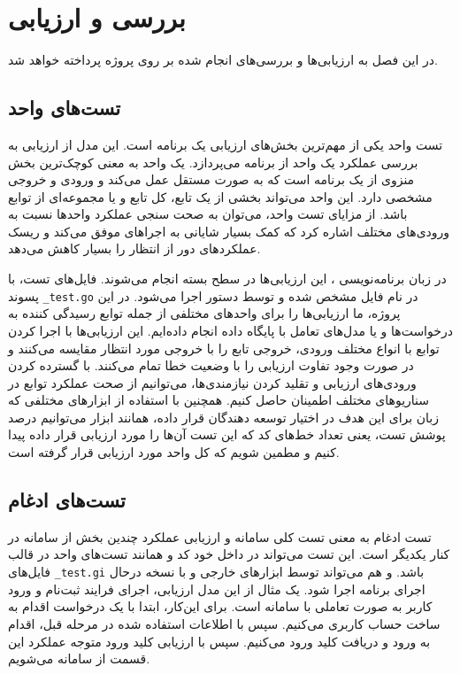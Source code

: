 \chapter{بررسی و ارزیابی}
در این فصل به ارزیابی‌ها و بررسی‌های انجام شده بر روی پروژه پرداخته خواهد شد.

\section{تست‌های واحد}
تست واحد یکی از مهم‌ترین بخش‌های ارزیابی یک برنامه است. این مدل از ارزیابی به بررسی عملکرد یک واحد از برنامه می‌پردازد. یک واحد به معنی کوچک‌ترین بخش منزوی از یک برنامه ‌است که به صورت مستقل عمل می‌کند و ورودی و خروجی مشخصی دارد. این واحد می‌تواند بخشی از یک تابع، کل تابع و یا مجموعه‌ای از توابع باشد. از مزایای تست واحد، می‌توان به صحت سنجی عملکرد واحد‌ها نسبت به ورودی‌های مختلف اشاره کرد که کمک بسیار شایانی به اجرا‌های موفق می‌کند و ریسک عملکردهای دور از انتظار را بسیار کاهش می‌دهد. 

در زبان برنامه‌نویسی ، این ارزیابی‌ها در سطح بسته انجام می‌شوند. فایل‌های تست، با پسوند \texttt{\_test.go} در نام فایل مشخص شده و توسط دستور  اجرا می‌شود. در این پروژه، ما ارزیابی‌ها را برای واحدهای مختلفی از جمله توابع رسیدگی کننده به درخواست‌ها و یا مدل‌های تعامل با پایگاه داده انجام داده‌ایم. این ارزیابی‌ها با اجرا کردن توابع با انواع مختلف ورودی، خروجی تابع را با خروجی مورد انتظار مقایسه می‌کنند و در صورت وجود تفاوت ارزیابی را با وضعیت خطا تمام می‌کنند. با گسترده کردن ورودی‌های ارزیابی و تقلید کردن نیازمندی‌ها، می‌توانیم از صحت عملکرد توابع در سناریو‌های مختلف اطمینان حاصل کنیم. همچنین با استفاده از ابزار‌های مختلفی که زبان  برای این هدف در اختیار توسعه دهندگان قرار داده، همانند ابزار  می‌توانیم درصد پوشش تست، یعنی تعداد خط‌های کد که این تست آن‌ها را مورد ارزیابی قرار داده پیدا کنیم و مطمین شویم که کل واحد مورد ارزیابی قرار گرفته است.


\section{تست‌های ادغام}
تست ادغام به معنی تست کلی سامانه و ارزیابی عملکرد چندین بخش از سامانه در کنار یکدیگر است. این تست می‌تواند در داخل خود کد و همانند تست‌های واحد در قالب فایل‌های \texttt{\_test.gi} باشد. و هم می‌تواند توسط ابزار‌های خارجی و با نسخه درحال اجرای برنامه اجرا شود. یک مثال از این مدل ارزیابی، اجرای فرایند ثبت‌نام و ورود کاربر به صورت تعاملی با سامانه است. برای این‌کار، ابتدا با یک درخواست اقدام به ساخت حساب کاربری می‌کنیم. سپس با اطلاعات استفاده شده در مرحله قبل، اقدام به ورود و دریافت کلید ورود می‌کنیم. سپس با ارزیابی کلید ورود متوجه عملکرد این قسمت از سامانه می‌شویم.

